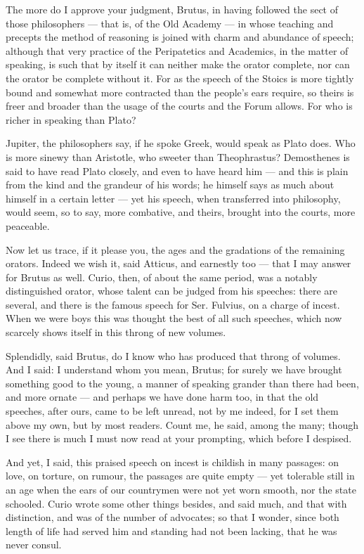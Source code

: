  The more do I approve your judgment, Brutus, in having followed the sect of those philosophers — that is, of the Old Academy — in whose teaching and precepts the method of reasoning is joined with charm and abundance of speech; although that very practice of the Peripatetics and Academics, in the matter of speaking, is such that by itself it can neither make the orator complete, nor can the orator be complete without it. For as the speech of the Stoics is more tightly bound and somewhat more contracted than the people's ears require, so theirs is freer and broader than the usage of the courts and the Forum allows. For who is richer in speaking than Plato?

 Jupiter, the philosophers say, if he spoke Greek, would speak as Plato does. Who is more sinewy than Aristotle, who sweeter than Theophrastus? Demosthenes is said to have read Plato closely, and even to have heard him — and this is plain from the kind and the grandeur of his words; he himself says as much about himself in a certain letter — yet his speech, when transferred into philosophy, would seem, so to say, more combative, and theirs, brought into the courts, more peaceable.

 Now let us trace, if it please you, the ages and the gradations of the remaining orators. Indeed we wish it, said Atticus, and earnestly too — that I may answer for Brutus as well. Curio, then, of about the same period, was a notably distinguished orator, whose talent can be judged from his speeches: there are several, and there is the famous speech for Ser. Fulvius, on a charge of incest. When we were boys this was thought the best of all such speeches, which now scarcely shows itself in this throng of new volumes.

 Splendidly, said Brutus, do I know who has produced that throng of volumes. And I said: I understand whom you mean, Brutus; for surely we have brought something good to the young, a manner of speaking grander than there had been, and more ornate — and perhaps we have done harm too, in that the old speeches, after ours, came to be left unread, not by me indeed, for I set them above my own, but by most readers. Count me, he said, among the many; though I see there is much I must now read at your prompting, which before I despised.

 And yet, I said, this praised speech on incest is childish in many passages: on love, on torture, on rumour, the passages are quite empty — yet tolerable still in an age when the ears of our countrymen were not yet worn smooth, nor the state schooled. Curio wrote some other things besides, and said much, and that with distinction, and was of the number of advocates; so that I wonder, since both length of life had served him and standing had not been lacking, that he was never consul.

